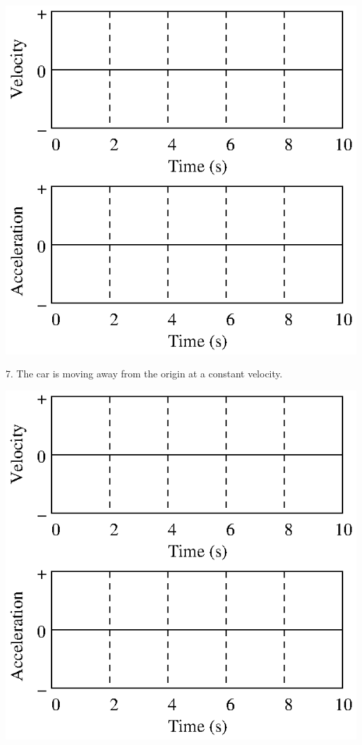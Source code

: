 \vspace{0.3cm}
{\par\centering \includegraphics{changing/changing_fig12.eps} \par}
\vspace{0.3cm}

7. The car is moving away from the origin at a constant velocity.

\vspace{0.3cm}
{\par\centering \includegraphics{changing/changing_fig12.eps} \par}
\vspace{0.3cm}

